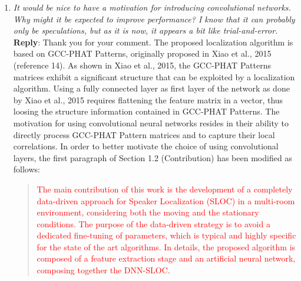 \documentclass[11pt, technote, letterpaper, oneside, onecolumn]{IEEEtran}
\begin{document}
\begin{enumerate}


\item \textit{It would be nice to have a motivation for introducing convolutional networks. Why might it be expected to improve performance? I know that it can probably only be speculations, but as it is now, it appears a bit like trial-and-error.\\}
\textbf{Reply}: Thank you for your comment. The proposed localization algorithm is based on GCC-PHAT Patterns, originally proposed in Xiao et al., 2015 (reference 14). As shown in Xiao et al., 2015, the GCC-PHAT Patterns matrices exhibit a significant structure that can be exploited by a localization algorithm. Using a fully connected layer as first layer of the network as done by Xiao et al., 2015 requires flattening the feature matrix in a vector, thus loosing the structure information contained in GCC-PHAT Patterns. The motivation for using convolutional neural networks resides in their ability to directly process GCC-PHAT Pattern matrices and to capture their local correlations. In order to better motivate the choice of using convolutional layers, the first paragraph of Section 1.2 (Contribution) has been modified as follows:
\begin{quote}
\textcolor{red}{
The main contribution of this work is the development of a completely data-driven approach for Speaker Localization (SLOC) in a multi-room environment, considering both the moving and the stationary conditions. %
The purpose of the data-driven strategy is to avoid a dedicated fine-tuning of parameters, which is typical and highly specific for the state of the art algorithms.
In details, the proposed algorithm is composed of a feature extraction stage and an artificial neural network, composing together the DNN-SLOC. %
}
\end{quote}
\end{enumerate}
\end{document}
